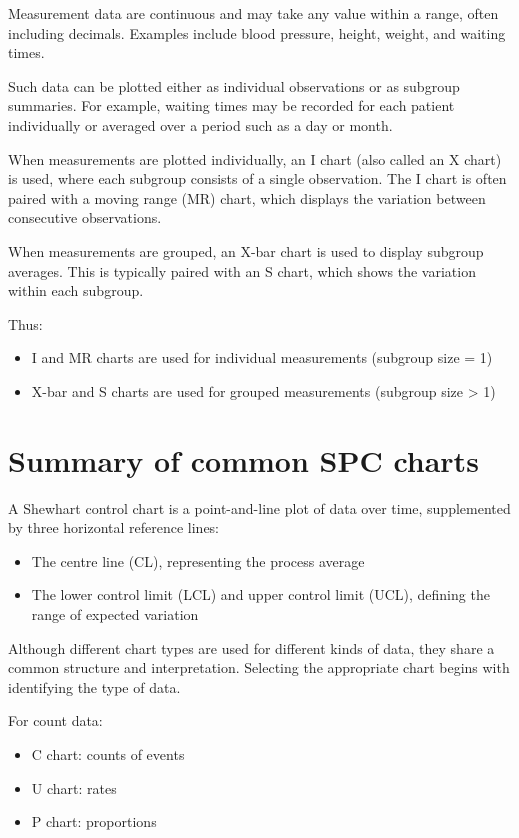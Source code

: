 \documentclass[
]{book}
\providecommand{\tightlist}{%
  \setlength{\itemsep}{0pt}\setlength{\parskip}{0pt}}
\begin{document}
Measurement data are continuous and may take any value within a range,
often including decimals. Examples include blood pressure, height,
weight, and waiting times.

Such data can be plotted either as individual observations or as
subgroup summaries. For example, waiting times may be recorded for each
patient individually or averaged over a period such as a day or month.

When measurements are plotted individually, an I chart (also called an X
chart) is used, where each subgroup consists of a single observation.
The I chart is often paired with a moving range (MR) chart, which
displays the variation between consecutive observations.

When measurements are grouped, an X-bar chart is used to display
subgroup averages. This is typically paired with an S chart, which shows
the variation within each subgroup.

Thus:

\begin{itemize}
\tightlist
\item
  I and MR charts are used for individual measurements (subgroup size =
  1)
\item
  X-bar and S charts are used for grouped measurements (subgroup size
  \textgreater{} 1)
\end{itemize}

\section{Summary of common SPC
charts}\label{summary-of-common-spc-charts}

A Shewhart control chart is a point-and-line plot of data over time,
supplemented by three horizontal reference lines:

\begin{itemize}
\tightlist
\item
  The centre line (CL), representing the process average
\item
  The lower control limit (LCL) and upper control limit (UCL), defining
  the range of expected variation
\end{itemize}

Although different chart types are used for different kinds of data,
they share a common structure and interpretation. Selecting the
appropriate chart begins with identifying the type of data.

For count data:

\begin{itemize}
\tightlist
\item
  C chart: counts of events
\item
  U chart: rates
\item
  P chart: proportions
\end{itemize}
\end{document}
